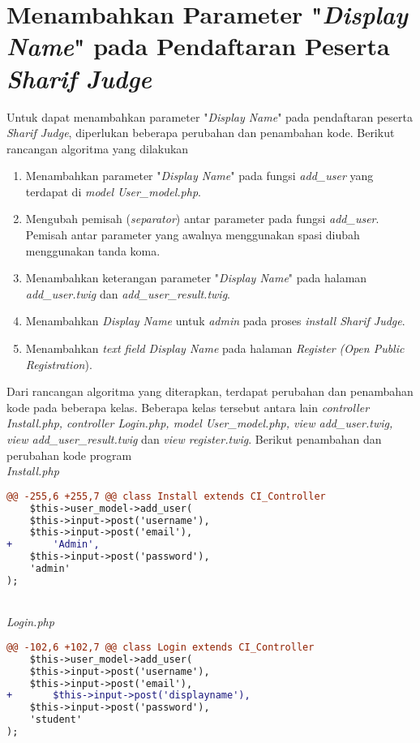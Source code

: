 \section{Menambahkan Parameter "\textit{Display Name}" pada Pendaftaran Peserta \textit{Sharif Judge}}
Untuk dapat menambahkan parameter "\textit{Display Name}" pada pendaftaran peserta \textit{Sharif Judge}, diperlukan beberapa perubahan dan penambahan kode. Berikut rancangan algoritma yang dilakukan
\begin{enumerate}
	\item Menambahkan parameter "\textit{Display Name}" pada fungsi \textit{add\_user} yang terdapat di \textit{model User\_model.php}.
	\item Mengubah pemisah (\textit{separator}) antar parameter pada fungsi \textit{add\_user}. Pemisah antar parameter yang awalnya menggunakan spasi diubah menggunakan tanda koma.
	\item Menambahkan keterangan parameter "\textit{Display Name}" pada halaman \textit{add\_user.twig} dan  \textit{add\_user\_result.twig}.
	\item Menambahkan \textit{Display Name} untuk \textit{admin} pada proses \textit{install Sharif Judge}.
	\item Menambahkan \textit{text field Display Name} pada halaman \textit{Register} \textit{(Open Public Registration}).
\end{enumerate}
Dari rancangan algoritma yang diterapkan, terdapat perubahan dan penambahan kode pada beberapa kelas. Beberapa kelas tersebut antara lain \textit{controller Install.php, controller Login.php, model User\_model.php, view add\_user.twig, view add\_user\_result.twig} dan \textit{view register.twig}.
Berikut penambahan dan perubahan kode program
~\\
\textit{Install.php}
\begin{lstlisting}[language=diff, basicstyle=\ttfamily, frame=single,
columns=fullflexible, keepspaces=true, breaklines=true]
@@ -255,6 +255,7 @@ class Install extends CI_Controller
	$this->user_model->add_user(
	$this->input->post('username'),
	$this->input->post('email'),
+   	'Admin',
	$this->input->post('password'),
	'admin'
);
\end{lstlisting}
~\\
\textit{Login.php}
\begin{lstlisting}[language=diff, basicstyle=\ttfamily, frame=single,
columns=fullflexible, keepspaces=true, breaklines=true]
@@ -102,6 +102,7 @@ class Login extends CI_Controller
	$this->user_model->add_user(
	$this->input->post('username'),
	$this->input->post('email'),
+   	$this->input->post('displayname'),
	$this->input->post('password'),
	'student'
);
\end{lstlisting}
